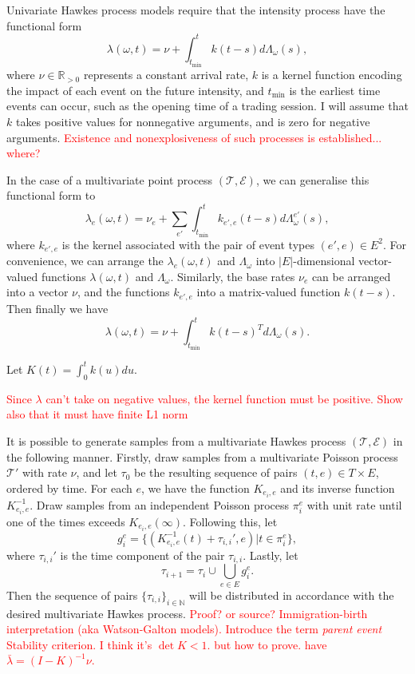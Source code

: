 \documentclass[honours,12pt]{unswthesis}
\numberwithin{equation}{section}
\begin{document}
Univariate Hawkes process models require that the intensity process have the functional form
$$\lambda(\omega,t) = \nu + \int_{t_\mathrm{min}}^t k(t-s)d\Lambda_\omega(s),$$
where $\nu\in\mathbb{R}_{>0}$ represents a constant arrival rate, $k$ is a kernel function encoding the impact of each event on the future intensity, and $t_\mathrm{\min}$ is the earliest time events can occur, such as the opening time of a trading session. I will assume that $k$ takes positive values for nonnegative arguments, and is zero for negative arguments. \textcolor{red}{Existence and nonexplosiveness of such processes is established... where?}

In the case of a multivariate point process $(\mathcal{T},\mathcal{E})$, we can generalise this functional form to
$$\lambda_e(\omega,t) = \nu_e + \sum_{e'} \int_{t_\mathrm{min}}^t k_{e',e}(t-s)d\Lambda_\omega^{e'}(s),$$
where $k_{e',e}$ is the kernel associated with the pair of event types $(e',e)\in E^2$. For convenience, we can arrange the $\lambda_e(\omega,t)$ and $\Lambda_\omega$ into $\vert E\vert$-dimensional vector-valued functions $\lambda(\omega,t)$ and $\Lambda_\omega$. Similarly, the base rates $\nu_e$ can be arranged into a vector $\nu$, and the functions $k_{e',e}$ into a matrix-valued function $k(t-s)$. Then finally we have
$$\lambda(\omega,t) = \nu + \int_{t_\mathrm{min}}^t k(t-s)^T d\Lambda_\omega(s).$$

Let $K(t)=\int_0^t k(u)du$.

\textcolor{red}{Since $\lambda$ can't take on negative values, the kernel function must be positive. Show also that it must have finite L1 norm}

It is possible to generate samples from a multivariate Hawkes process $(\mathcal{T},\mathcal{E})$ in the following manner. Firstly, draw samples from a multivariate Poisson process $\mathcal{T}'$ with rate $\nu$, and let $\tau_0$ be the resulting sequence of pairs $(t,e)\in T\times E$, ordered by time. For each $e$, we have the function $K_{e_i,e}$ and its inverse function $K_{e_i,e}^{-1}$. Draw samples from an independent Poisson process $\pi_i^e$ with unit rate until one of the times exceeds $K_{e_i,e}(\infty)$. Following this, let $$g_i^e=\{(K_{e_i,e}^{-1}(t)+\tau_{i,i}',e) \vert t\in\pi_i^e\},$$ where $\tau_{i,i}'$ is the time component of the pair $\tau_{i,i}$. Lastly, let $$\tau_{i+1}=\tau_i\cup \bigcup_{e\in E}g_i^e.$$ Then the sequence of pairs $\{\tau_{i,i}\}_{i\in\mathbb{N}}$ will be distributed in accordance with the desired multivariate Hawkes process. \textcolor{red}{Proof? or source? Immigration-birth interpretation \cite{MorariuPatrichiPakkanen} (aka Watson-Galton models). Introduce the term \textit{parent event}}
\textcolor{red}{Stability criterion. I think it's $\det K<1$. but how to prove. have $\bar\lambda = (I-K)^{-1}\nu$.}
\end{document}
